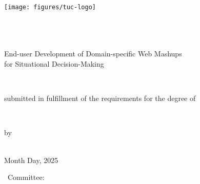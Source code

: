 

\begin{titlepage}
	\myfont
	\centering
	
	\texttt{[image: figures/tuc-logo]}\\
	\hrulefill\\[1em]
	{\normalsize \thesisUniversityDepartment}\\[0.0em]
	{\normalsize \thesisUniversityGroup}\\[7mm]
	
	\vfill
	
	\begin{spacing}{1.5}
		{\Large End-user Development of Domain-specific Web Mashups \\for Situational Decision-Making}\\[7mm]
	\end{spacing}

	
	\vfill
	
	{\large \thesisSubject}\\[1mm]
	\begin{minipage}[t]{.4\textwidth}
		\begin{center}
			{\footnotesize submitted in fulfillment of the requirements for the degree of}
		\end{center}
	\end{minipage}\\[1mm]
	{\large \thesisDegree}
	
	\vfill
	
	{\small by}\\[1mm]
	{\large \thesisAuthorName}\\
	
	\vfill
	
	Month Day, 2025
	
	\vfill
	{\small \thesisSubject~Committee:}\\[1mm]
	{\normalsize \thesisFirstReviewer} \\
\end{titlepage}


